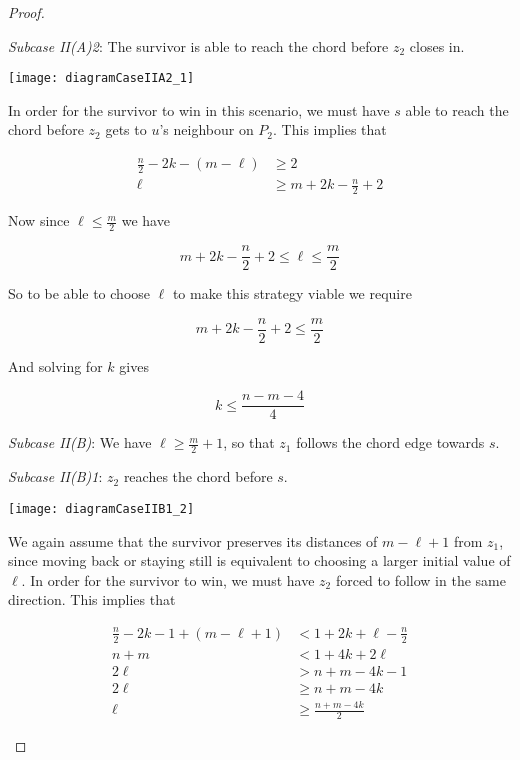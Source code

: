 \documentclass[letterpaper, 10pt]{article}
\begin{document}
\begin{proof}
\begin{proofpart}
\emph{Subcase II(A)2}: The survivor is able to reach the chord before $z_2$ closes in.

\begin{center}
\texttt{[image: diagramCaseIIA2\_1]}
\end{center}

In order for the survivor to win in this scenario, we must have $s$ able to
reach the chord before $z_2$ gets to $u$'s neighbour on $P_2$. This implies that

\begin{align*}
\frac{n}{2} - 2k - (m-\ell) & \geq 2                        \\
  \ell                        & \geq m + 2k - \frac{n}{2} + 2
\end{align*}

Now since $\ell \leq \frac{m}{2}$ we have

\[ m+2k-\frac{n}{2} +2 \leq \ell \leq \frac{m}{2} \]

So to be able to choose $\ell$ to make this strategy viable we require

\[ m+2k-\frac{n}{2} +2 \leq \frac{m}{2} \]

And solving for $k$ gives

\[ k \leq \frac{n-m-4}{4} \]

\emph{Subcase II(B)}: We have $\ell \geq \frac{m}{2}+1$, so that $z_1$ follows the chord edge towards $s$.

\emph{Subcase II(B)1}: $z_2$ reaches the chord before $s$.

\begin{center}
\texttt{[image: diagramCaseIIB1\_2]}
\end{center}

We again assume that the survivor preserves its distances of $m-\ell+1$ from $z_1$,
since moving back or staying still is equivalent to choosing a larger initial value of $\ell$.
In order for the survivor to win, we must have $z_2$ forced to follow in the same direction.
This implies that

\begin{align*}
\frac{n}{2} -2k -1 + (m-\ell+1) & < 1 + 2k + \ell - \frac{n}{2} \\
n+m                          & < 1 + 4k + 2\ell              \\
2\ell                           & > n+m - 4k -1              \\
2\ell                           & \geq n+m -4k               \\
\ell                            & \geq \frac{n+m-4k}{2}
\end{align*}


\end{proofpart}
\end{proof}
\end{document}
